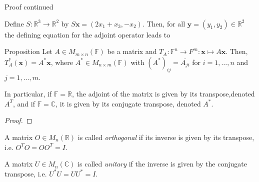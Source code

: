 \documentclass [aspectratio=169]{beamer}
\newcommand{\bx}{{\mathbf{x}}}
\newcommand{\by}{{\mathbf{y}}}
\newcommand{\R}{{\mathbb{R}}}
\newcommand{\C}{{\mathbb{C}}}
\newcommand{\F}{{\mathbb{F}}}
\begin{document}
\begin{frame}
\begin{block}{Proof continued}
\vspace{6cm}
\end{block}
\end{frame}



\begin{frame}
\begin{example}
Define $S \colon \R^3 \to \R^2$ by $S\bx = (2x_1+x_3,-x_2)$. Then, for all $\by= (y_1,y_2) \in \R^2$ the defining equation for the adjoint operator leads to

\vspace{5cm}

\end{example}
\end{frame}


\begin{frame}
\begin{exampleblock}{Proposition}
Let $A\in M_{m\times n}(\F)$ be a matrix and $T_A\colon \F^n\to F^m \colon \bx \mapsto A\bx$. Then, $T_A^*(\bx) = A^* \bx $, where $A^*\in M_{n\times m}(\F)$ with $(A^*)_{ij} = \overline{A_{ji}}$ for $i=1,\ldots,n$ and $j=1,\ldots,m$. 

\vspace{1em}
In particular, if $\F = \R$, the adjoint of the matrix is given by its transpose,denoted $A^T$, and if $\F = \C$, it is given by its conjugate transpose, denoted $A^*$.
\end{exampleblock}
\end{frame}

\begin{frame}
\begin{proof}
\vspace{6cm}
\end{proof}
\end{frame}


\begin{frame}
\begin{definition}
A matrix $O\in M_n(\R)$ is called \emph{orthogonal} if its inverse is given by its transpose, i.e. $O^T O = O O^T = I$. 

\vspace{0.5em}
A matrix $U\in M_n(\C)$ is called \emph{unitary} if the inverse is given by the conjugate transpose, i.e. $U^* U = U U^* = I$.
\end{definition}
\end{frame}
\end{document}
